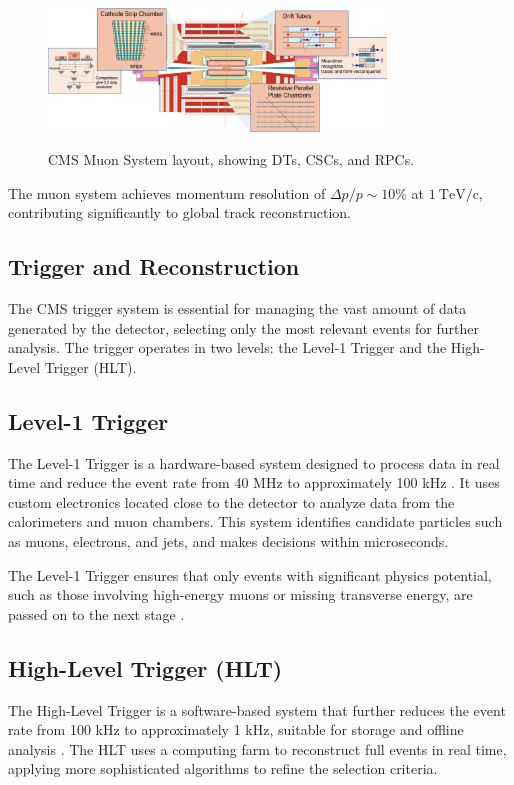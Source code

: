 \begin{figure}[ht]
    \centering
    \includegraphics[width=0.8\textwidth]{Figures/muon_detector.png} %
    \caption{CMS Muon System layout, showing DTs, CSCs, and RPCs.}  \cite{muon_detector}
    \label{fig:muon_detector}
\end{figure}

The muon system achieves momentum resolution of $\Delta p / p \sim 10\%$ at $1~\mathrm{TeV/c}$, contributing significantly to global track reconstruction.\cite{cms_tdr_muon}

\subsection{Trigger and Reconstruction}
The CMS trigger system is essential for managing the vast amount of data generated by the detector, selecting only the most relevant events for further analysis. The trigger operates in two levels: the Level-1 Trigger and the High-Level Trigger (HLT).

\subsection{Level-1 Trigger}
The Level-1 Trigger is a hardware-based system designed to process data in real time and reduce the event rate from 40 MHz to approximately 100 kHz \cite{trigger_tdr}. It uses custom electronics located close to the detector to analyze data from the calorimeters and muon chambers. This system identifies candidate particles such as muons, electrons, and jets, and makes decisions within microseconds.

The Level-1 Trigger ensures that only events with significant physics potential, such as those involving high-energy muons or missing transverse energy, are passed on to the next stage \cite{trigger_tdr}.

\subsection{High-Level Trigger (HLT)}
The High-Level Trigger is a software-based system that further reduces the event rate from 100 kHz to approximately 1 kHz, suitable for storage and offline analysis \cite{trigger_tdr}. The HLT uses a computing farm to reconstruct full events in real time, applying more sophisticated algorithms to refine the selection criteria.

